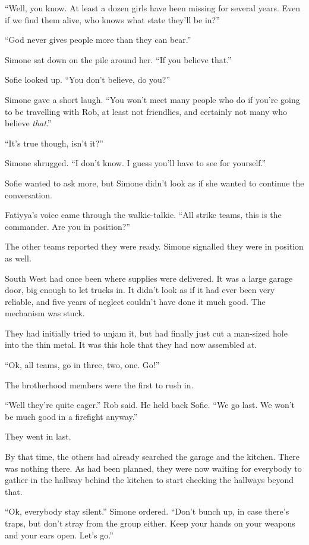 \documentclass[letterpaper,12pt]{report}
\begin{document}
``Well, you know. At least a dozen girls have been missing for several years. Even if we find them alive, who knows what state they'll be in?''

``God never gives people more than they can bear.''

Simone sat down on the pile around her. ``If you believe that.''

Sofie looked up. ``You don't believe, do you?''

Simone gave a short laugh. ``You won't meet many people who do if you're going to be travelling with Rob, at least not friendlies, and certainly not many who believe \textit{that}.''

``It's true though, isn't it?''

Simone shrugged. ``I don't know. I guess you'll have to see for yourself.''

Sofie wanted to ask more, but Simone didn't look as if she wanted to continue the conversation.
\act

Fatiyya's voice came through the walkie-talkie. ``All strike teams, this is the commander. Are you in position?''

The other teams reported they were ready. Simone signalled they were in position as well.

South West had once been where supplies were delivered. It was a large garage door, big enough to let trucks in. It didn't look as if it had ever been very reliable, and five years of neglect couldn't have done it much good. The mechanism was stuck.

They had initially tried to unjam it, but had finally just cut a man-sized hole into the thin metal. It was this hole that they had now assembled at.

``Ok, all teams, go in three, two, one. Go!''

The brotherhood members were the first to rush in.

``Well they're quite eager.'' Rob said. He held back Sofie. ``We go last. We won't be much good in a firefight anyway.''

They went in last.

By that time, the others had already searched the garage and the kitchen. There was nothing there. As had been planned, they were now waiting for everybody to gather in the hallway behind the kitchen to start checking the hallways beyond that.

``Ok, everybody stay silent.'' Simone ordered. ``Don't bunch up, in case there's traps, but don't stray from the group either. Keep your hands on your weapons and your ears open. Let's go.''
\end{document}
